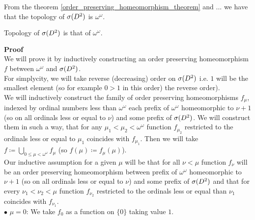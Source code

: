 From the theorem \ref{order_preserving_homeomorphism_theorem} and ... we have that 
the topology of ${{\sigma}(D^2)}$ is $\omega^\omega$. 


\begin{theorem}\label{speD_theorem}
Topology of ${{\sigma}(D^2)}$ is that of $\omega^\omega$. 
\end{theorem}

\textbf{Proof} \\
We will prove it by inductively constructing an order preserving homeomorphism $f$ between 
$\omega^\omega$ and ${{\sigma}(D^2)}$. \\
For simplycity, we will take reverse (decreasing) order on ${{\sigma}(D^2)}$ i.e. $1$ will be the smallest 
 element 
(so for example $0 > 1$ in this order)
the reverse order).  \\
We will inductively construct the family of order preserving homeomorphisms $f_\mu$, 
indexed by ordinal numbers less 
than 
$\omega^\omega$ each 
prefix of $\omega^\omega$ homeomorphic to $\nu + 1$ (so on all ordinals less 
or equal to $\nu$) 
and some prefix of ${{\sigma}(D^2)}$. We will construct them in such a way, that for any $\mu_1 < \mu_2 
< \omega^\omega$ function $f_{\mu_2}$ restricted to the ordinals less or equal to 
$\mu_1$ coincides with $f_{\mu_1}$.
Then we will take $f \coloneqq \bigcup\limits_{0 \leq \mu < 
\omega^\omega} f_\mu$ (so $f(\mu) \coloneqq f_\mu(\mu)$). \\
Our inductive assumption for a given $\mu$ will be that 
for all $\nu < \mu$ function $f_\nu$ will be an order preserving homeomorphism 
between prefix of $\omega^\omega$ homeomorphic to $\nu + 1$ (so on all ordinals less 
or equal to $\nu$) 
and some prefix of ${{\sigma}(D^2)}$ and that for every $\nu_1 < \nu_2 < \mu$ function $f_{\nu_2}$ 
restricted to the ordinals less or equal than $\nu_1$ coincides with $f_{\nu_1}$. \\ 
$\bullet$ $\mu = 0$: We take $f_0$ as a function on $\{0\}$ taking value $1$. 
